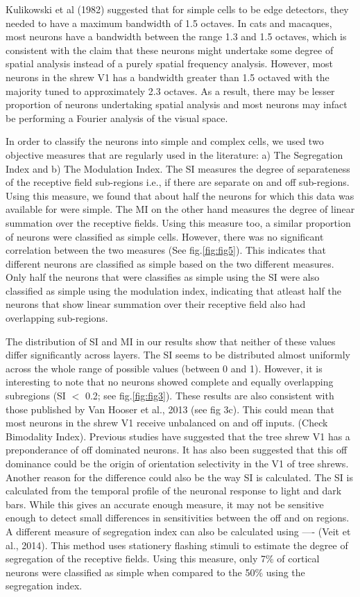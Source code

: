 	Kulikowski et al (1982) suggested that for simple cells to be edge detectors, they needed to have a maximum bandwidth of 1.5 octaves. In cats and macaques, most neurons have a bandwidth between the range 1.3 and 1.5 octaves, which is consistent with the claim that these neurons might undertake some degree of spatial analysis instead of a purely spatial frequency analysis. However, most neurons in the shrew V1 has a bandwidth greater than 1.5 octaved with the majority tuned to approximately 2.3 octaves. As a result, there may be lesser proportion of neurons undertaking spatial analysis and most neurons may infact be performing a Fourier analysis of the visual space. 
	
	In order to classify the neurons into simple and complex cells, we used two objective measures that are regularly used in the literature: a) The Segregation Index and b) The Modulation Index. The SI measures the degree of separateness of the receptive field sub-regions i.e., if there are separate on and off sub-regions. Using this measure, we found that about half the neurons for which this data was available for were simple. The MI on the other hand measures the degree of linear summation over the receptive fields. Using this measure too, a similar proportion of  neurons were classified as simple cells. However, there was no significant correlation between the two measures (See fig.\ref{fig:fig5}). This indicates that different neurons are classified as simple based on the two different measures. Only half the neurons that were classifies as simple using the SI were also classified as simple using the modulation index, indicating that atleast half the neurons that show linear summation over their receptive field also had overlapping sub-regions. 
	
	The distribution of SI and MI in our results show that neither of these values differ significantly across layers. The SI seems to be distributed almost uniformly across the whole range of possible values (between 0 and 1). However, it is interesting to note that no neurons showed complete and equally overlapping subregions (SI $<$ 0.2; see fig.\ref{fig:fig3}). These results are also consistent with those published by Van Hooser et al., 2013 (see fig 3c). This could mean that most neurons in the shrew V1 receive unbalanced on and off inputs. (Check Bimodality Index). Previous studies have suggested that the tree shrew V1 has a preponderance of off dominated neurons. It has also been suggested that this off dominance could be the origin of orientation selectivity in the V1 of tree shrews. Another reason for the difference could also be the way SI is calculated. The SI is calculated from the temporal profile of the neuronal response to light and dark bars. While this gives an accurate enough measure, it may not be sensitive enough to detect small differences in sensitivities between the off and on regions. A different measure of segregation index can also be calculated using ---- (Veit et al., 2014). This method uses stationery flashing stimuli to estimate the degree of segregation of the receptive fields. Using this measure, only 7\% of cortical neurons were classified as simple when compared to the 50\% using the segregation index.
	
